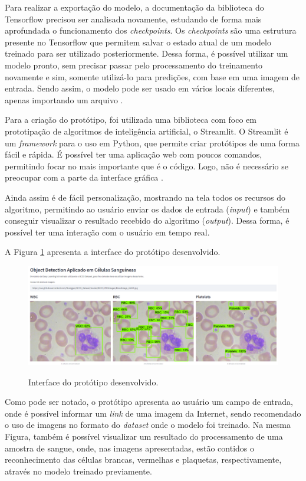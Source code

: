 Para realizar a exportação do modelo, a documentação da biblioteca do Tensorflow precisou ser analisada novamente, estudando de forma mais aprofundada o funcionamento dos \emph{checkpoints}. Os \emph{checkpoints} são uma estrutura presente no Tensorflow que permitem salvar o estado atual de um modelo treinado para ser utilizado posteriormente. Dessa forma, é possível utilizar um modelo pronto, sem precisar passar pelo processamento do treinamento novamente e sim, somente utilizá-lo para predições, com base em uma imagem de entrada. Sendo assim, o modelo pode ser usado em vários locais diferentes, apenas importando um arquivo \cite{websiteTensorFlow}.

Para a criação do protótipo, foi utilizada uma biblioteca com foco em prototipação de algoritmos de inteligência artificial, o Streamlit. O Streamlit é um \emph{framework} para o uso em Python, que permite criar protótipos de uma forma fácil e rápida. É possível ter uma aplicação web com poucos comandos, permitindo focar no mais importante que é o código. Logo, não é necessário se preocupar com a parte da interface gráfica \cite{websiteStreamlit}.

Ainda assim é de fácil personalização, mostrando na tela todos os recursos do algoritmo, permitindo ao usuário enviar os dados de entrada (\emph{input}) e também conseguir visualizar o resultado recebido do algoritmo (\emph{output}). Dessa forma, é possível ter uma interação com o usuário em tempo real.

A Figura \ref{fig:prototipo} apresenta a interface do protótipo desenvolvido.

\begin{figure}[!htb]
	\centering
	\caption{Interface do protótipo desenvolvido.}
	\includegraphics[width=1.0\textwidth]{img/prototipo.png}
	\label{fig:prototipo}
\end{figure}

Como pode ser notado, o protótipo apresenta ao usuário um campo de entrada, onde é possível informar um \emph{link} de uma imagem da Internet, sendo recomendado o uso de imagens no formato do \emph{dataset} onde o modelo foi treinado. Na mesma Figura, também é possível visualizar um resultado do processamento de uma amostra de sangue, onde, nas imagens apresentadas, estão contidos o reconhecimento das células brancas, vermelhas e plaquetas, respectivamente, através no modelo treinado previamente.

